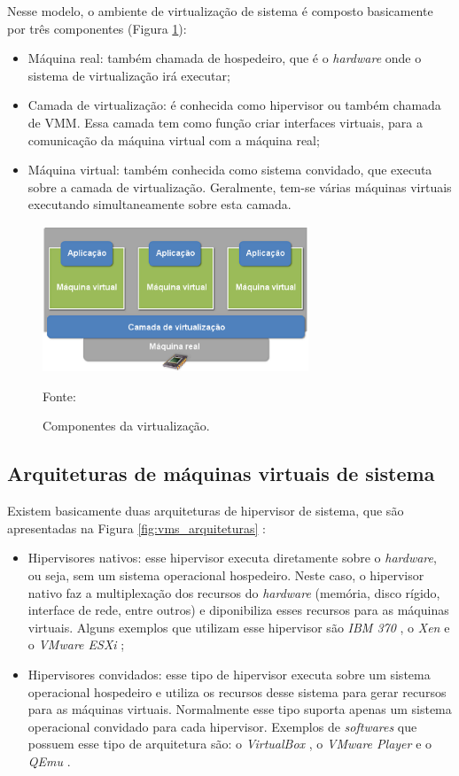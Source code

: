 Nesse modelo, o ambiente de virtualização de sistema é composto basicamente por três componentes (Figura \ref{fig:virtcomponentes}):
\begin{itemize}
 \item Máquina real: também chamada de hospedeiro, que é o \textit{hardware} onde o sistema de virtualização irá executar;
 \item Camada de virtualização: é conhecida como hipervisor ou também chamada de \ac{VMM}. Essa camada tem como função criar interfaces 
 virtuais, para a comunicação da máquina virtual com a máquina real;
 \item Máquina virtual: também conhecida como sistema convidado, que executa sobre a camada de virtualização. Geralmente, tem-se
 várias máquinas virtuais executando simultaneamente sobre esta camada.
\end{itemize}

\begin{figure}[h!]
 \centering
 \includegraphics[width=300px]{img/virtcomponentes.eps}
 \caption{Componentes da virtualização.}
 \label{fig:virtcomponentes}
 Fonte: \citet{andrade2011}
\end{figure}

\subsection{Arquiteturas de máquinas virtuais de sistema}
\label{section:virtarquit}

Existem basicamente duas arquiteturas de hipervisor de sistema, que são apresentadas na Figura \ref{fig:vms_arquiteturas} \cite{maziero2013}:
\begin{itemize}
 \item Hipervisores nativos: esse hipervisor executa diretamente sobre o \textit{hardware}, ou seja, sem um sistema operacional
 hospedeiro. Neste caso, o hipervisor nativo faz a multiplexação dos recursos do \textit{hardware} (memória, disco rígido, interface de rede, 
 entre outros) e diponibiliza esses recursos para as máquinas virtuais. Alguns exemplos que utilizam esse hipervisor são 
 \textit{IBM 370} \cite{ibm370}, o \textit{Xen} \cite{xen} e o \textit{VMware ESXi} \cite{vmwareesxi};
 \item Hipervisores convidados: esse tipo de hipervisor executa sobre um sistema operacional hospedeiro e utiliza os recursos desse sistema 
 para gerar recursos para as máquinas virtuais. Normalmente esse tipo suporta apenas um sistema operacional convidado para cada 
 hipervisor. Exemplos de \textit{softwares} que possuem esse tipo de arquitetura são: o \textit{VirtualBox} \cite{virtualbox}, 
 o \textit{VMware Player} \cite{vmwareplayer} e o \textit{QEmu} \cite{qemu}.
\end{itemize}

